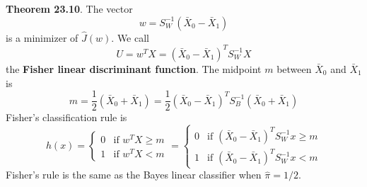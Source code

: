 \textbf{Theorem 23.10}. The vector
\[
w = S_W^{-1}(\bar{X}_{0} - \bar{X}_{1})
\]
is a minimizer of \(\hat{J}(w)\). We call
\[
U = w^T X = (\bar{X}_{0} - \bar{X}_{1})^T S_W^{-1} X
\]
the \textbf{Fisher linear discriminant function}. The midpoint \(m\)
between \(\bar{X}_{0}\) and \(\bar{X}_{1}\) is
\[
m = \frac{1}{2} (\bar{X}_{0} + \bar{X}_{1}) = \frac{1}{2}  (\bar{X}_{0} - \bar{X}_{1})^T S_B^{-1}  (\bar{X}_{0} + \bar{X}_{1})
\]
Fisher's classification rule is
\[
h(x) = \begin{cases}
0 & \text{if } w^T X \geq m \\
1 & \text{if } w^T X < m
\end{cases}
= \begin{cases}
0 & \text{if } (\bar{X}_{0} - \bar{X}_{1})^T S_W^{-1}x \geq m \\
1 & \text{if } (\bar{X}_{0} - \bar{X}_{1})^T S_W^{-1}x < m
\end{cases}
\]
Fisher's rule is the same as the Bayes linear classifier when
\(\hat{\pi} = 1/2\).

